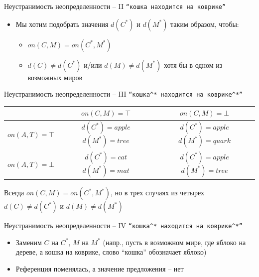 \documentclass{beamer}
\begin{document}
\begin{frame}{Неустранимость неопределенности -- II}
\texttt{``кошка находится на коврике''}
\bigskip
\begin{itemize}
	\item Мы хотим подобрать значения $d(C^*)$ и $d(M^*)$ таким образом, чтобы:
	    \smallskip
	    \begin{itemize}
	        \item $on(C, M) = on(C^*, M^*)$
	        \smallskip
	        \item $d(C) \neq d(C^*)$ и/или $d(M) \neq d(M^*)$ хотя бы в одном из возможных миров
	    \end{itemize}
\end{itemize}
\end{frame}

\begin{frame}{Неустранимость неопределенности -- III}
\texttt{``кошка$^*$ находится на коврике$^*$''}
\bigskip
\begin{table}
    \begin{tabular}{|l|c|c|}
        \hline
        ~                & $on(C,M) = \top$                 & $on(C,M) = \bot$                  \\ \hline
        $on(A,T) = \top$ & \parbox[t]{3cm}{$d(C^*) = apple$\\ $d(M^*) = tree$} & \parbox[t]{3cm}{$d(C^*) = apple$\\ $d(M^*) = quark$} \\ 
        $on(A,T) = \bot$ & \parbox[t]{3cm}{$d(C^*) = cat$\\ $d(M^*) = mat$} & \parbox[t]{3cm}{$d(C^*) = apple$\\ $d(M^*) = tree$} \\
        \hline
    \end{tabular}
\end{table}
\bigskip
Всегда $on(C,M) = on(C^*,M^*)$, но в трех случаях из четырех $d(C) \neq d(C^*)$ и $d(M) \neq d(M^*)$
\end{frame}

\begin{frame}{Неустранимость неопределенности -- IV}
\texttt{``кошка$^*$ находится на коврике$^*$''}
\bigskip
\begin{itemize}
	\item Заменим $C$ на $C^*$, $M$ на $M^*$ (напр., пусть в возможном мире, где яблоко на дереве, а кошка на коврике, слово ``кошка'' обозначает яблоко)
	\item Референция поменялась, а значение предложения -- нет
\end{itemize}
\end{frame}
\end{document}
